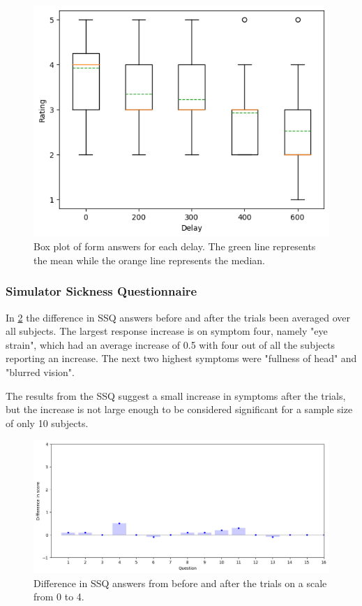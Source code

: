\documentclass[nofilelist]{cslthse-msc}
\begin{document}
\begin{figure}[!hbt]
   \centering
   \includegraphics[scale=0.6]{images/form-ans.png} 
   \caption{Box plot of form answers for each delay. The green line represents the mean while the orange line represents the median.}
   \label{fig:form-ans}
\end{figure}

\subsubsection{Simulator Sickness Questionnaire}
In \ref{fig:ssq-ans} the difference in SSQ answers before and after the trials been averaged over all subjects. The largest response increase is on symptom four, namely "eye strain", which had an average increase of  0.5 with four out of all the subjects reporting an increase. The next two highest symptoms were "fullness of head" and "blurred vision". 

The results from the SSQ suggest a small increase in  symptoms after the trials, but the increase is not large enough to be considered significant for a sample size of only 10 subjects.

\begin{figure}[!hbt]
   \centering
   \includegraphics[scale=0.6]{images/ssq-results.png} 
   \caption{Difference in SSQ answers from before and after the trials on a scale from 0 to 4.}
   \label{fig:ssq-ans}
\end{figure}
\end{document}
